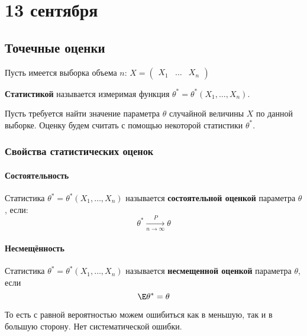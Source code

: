 \chapter{13 сентября}

\section{Точечные оценки}


Пусть имеется выборка объема \(n\): \(X = \begin{pmatrix}
    X_1 & \dots & X_n
\end{pmatrix}\)
\begin{definition}
    \textbf{Статистикой} называется измеримая функция \(\theta^* = \theta^*(X_1, \dots, X_n)\).
\end{definition}

Пусть требуется найти значение параметра \(\theta\) случайной величины \(X\) по данной выборке. Оценку будем считать с помощью некоторой статистики \(\theta^*\).

\subsection{Свойства статистических оценок}

\subsubsection{Состоятельность}

\begin{definition}
    Статистика \(\theta^* = \theta^*(X_1, \dots, X_n)\) называется \textbf{состоятельной оценкой} параметра \(\theta\), если:
    \[\theta^* \xrightarrow[n \to \infty]{P} \theta\]
\end{definition}

\subsubsection{Несмещённость}

\begin{definition}
    Статистика \(\theta^* = \theta^*(X_1, \dots, X_n)\) называется \textbf{несмещенной оценкой} параметра \(\theta\), если
    \[\E \theta^* = \theta\]
\end{definition}

\begin{remark}
    То есть с равной вероятностью можем ошибиться как в меньшую, так и в большую сторону. Нет систематической ошибки.
\end{remark}

